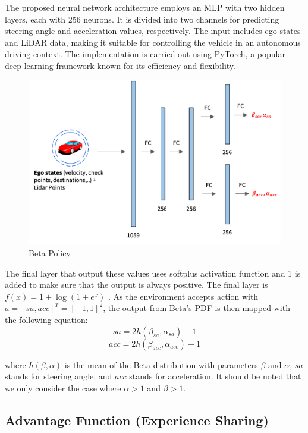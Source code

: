 The proposed neural network architecture employs an MLP with two hidden layers, each with 256 neurons. It is divided into two channels for predicting steering angle and acceleration values, respectively. The input includes ego states and LiDAR data, making it suitable for controlling the vehicle in an autonomous driving context. The implementation is carried out using PyTorch, a popular deep learning framework known for its efficiency and flexibility.
\begin{figure}[h!]
    \centering
    \includegraphics[width=12cm]{assets/beta_policy}
    \caption{Beta Policy}\label{fig:figure3}
\end{figure}

The final layer that output these values uses softplus
activation function and 1 is added to make sure that the output
is always positive. The final layer is $f(x) = 1 + \log (1 +
e^x)$ . As the environment accepts action with $a = [sa,acc]^T=[-1,1]^2$, the output from Beta's PDF is then mapped with the following equation:
\begin{equation}
    sa = 2h(\beta_{sa}, \alpha_{sa}) - 1\label{eq:equation5}
\end{equation}
\begin{equation}
    acc = 2h(\beta_{acc}, \alpha_{acc}) - 1\label{eq:equation6}
\end{equation}

where $h(\beta, \alpha)$ is the mean of the Beta distribution with parameters $\beta$ and $\alpha$, $sa$ stands for steering angle, and $acc$ stands for acceleration.
It should be noted that we only consider the case where $\alpha > 1$ and $\beta > 1$.

\subsection{Advantage Function (Experience Sharing)}\label{subsec:advantage-function}
